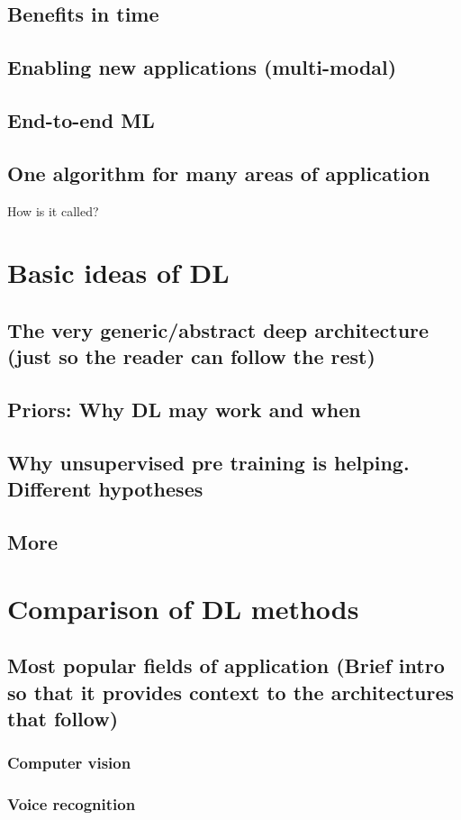 \documentclass[]{article}
\begin{document}
\subsection{Benefits in time}
\subsection{Enabling new applications (multi-modal)}
\subsection{End-to-end ML}
\subsection{One algorithm for many areas of application}
How is it called?
\section{Basic ideas of DL}
\subsection{The very generic/abstract deep architecture (just so the reader can follow the rest)}
\subsection{Priors: Why DL may work and when}
\subsection{Why unsupervised pre training is helping. Different hypotheses}	
\subsection{More}
\section{Comparison of DL methods}
\subsection{Most popular fields of application (Brief intro so that it provides context to the architectures that follow)}
\subsubsection{Computer vision}
\subsubsection{Voice recognition}
\end{document}
